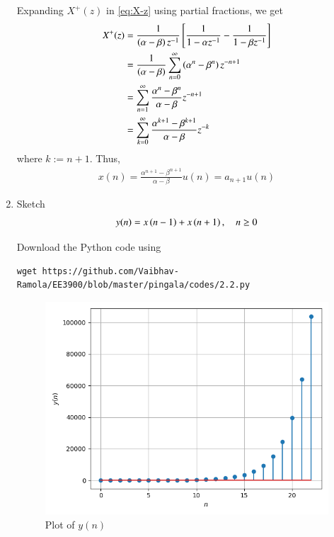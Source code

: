\documentclass[journal,12pt,twocolumn]{IEEEtran}
\renewcommand\thesection{\arabic{section}}
\begin{document}
\begin{enumerate}[label=\thesection.\arabic*,ref=\thesection.\theenumi]
\solution Expanding $X^+(z)$ in \eqref{eq:X-z} using partial fractions, we get
\begin{align}
	X^+(z) &= \frac{1}{\left(\alpha - \beta\right)z^{-1}}{}\left[\frac{1}{1 - \alpha z^{-1}} - \frac{1}{1 - \beta z^{-1}}\right] \\
	&= \frac{1}{\left(\alpha - \beta\right)}\sum_{n = 0}^{\infty}\left(\alpha^n - \beta^n\right)z^{-n + 1} \\
	&= \sum_{n = 1}^{\infty}\frac{\alpha^{n} - \beta^{n}}{\alpha - \beta}z^{-n + 1} \\
	&= \sum_{k = 0}^{\infty}\frac{\alpha^{k + 1} - \beta^{k + 1}}{\alpha - \beta}z^{-k}
\end{align}
where $k := n + 1$. Thus,
\begin{align}
	x(n) = \frac{\alpha^{n + 1} - \beta^{n + 1}}{\alpha - \beta}u(n) = a_{n + 1}u(n)
	\label{eq:x-n-def}
\end{align}
\item Sketch 
\begin{align}
	y(n) = x\left(n-1\right) + x\left(n+1\right),  \quad n \ge 0
	\label{eq:10-orig-diff-rev}
\end{align}

\solution Download the Python code using
\begin{lstlisting}
wget https://github.com/Vaibhav-Ramola/EE3900/blob/master/pingala/codes/2.2.py
\end{lstlisting}

\begin{figure}
	\includegraphics[width=\columnwidth]{./figs/2_2}
	\caption{Plot of $y(n)$}
	\label{fig:yn}
\end{figure}
\newpage


\end{enumerate}
\end{document}
